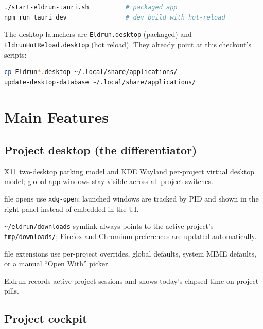 \documentclass[11pt,a4paper]{article}
\newcommand{\code}[1]{\texttt{#1}}
\begin{document}
\begin{lstlisting}[language=bash]
./start-eldrun-tauri.sh          # packaged app
npm run tauri dev                # dev build with hot-reload
\end{lstlisting}

The desktop launchers are \code{Eldrun.desktop} (packaged) and
\code{EldrunHotReload.desktop} (hot reload). They already point at this
checkout's scripts:

\begin{lstlisting}[language=bash]
cp Eldrun*.desktop ~/.local/share/applications/
update-desktop-database ~/.local/share/applications/
\end{lstlisting}

\section{Main Features}

\subsection{Project desktop (the differentiator)}

\begin{description}[leftmargin=1.2em,style=nextline]
  \item[Workspace management] X11 two-desktop parking model and KDE Wayland
  per-project virtual desktop model; global app windows stay visible across all
  project switches.
  \item[External window tracking] file opens use \code{xdg-open}; launched
  windows are tracked by PID and shown in the right panel instead of embedded in
  the UI.
  \item[Downloads routing] \code{\textasciitilde/eldrun/downloads} symlink always
  points to the active project's \code{tmp/downloads/}; Firefox and Chromium
  preferences are updated automatically.
  \item[Default app mapping] file extensions use per-project overrides, global
  defaults, system MIME defaults, or a manual ``Open With'' picker.
  \item[Time tracking] Eldrun records active project sessions and shows today's
  elapsed time on project pills.
\end{description}

\subsection{Project cockpit}
\end{document}
